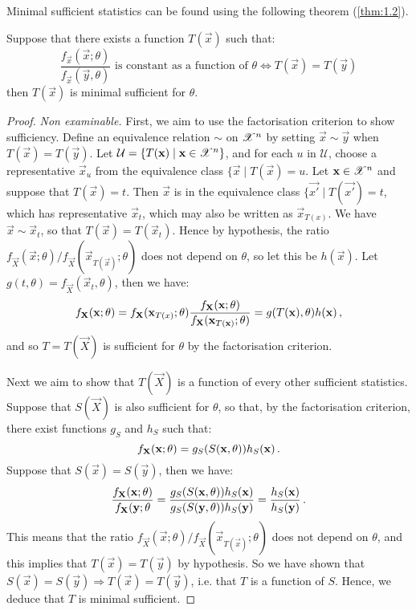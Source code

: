 Minimal sufficient statistics can be found using the following theorem (\ref{thm:1.2}).

\begin{theorem}
  \label{thm:1.2}

  Suppose that there exists a function $T(\vec{x})$ such that:
\[
\frac{f_{\vec{x}}(\vec{x}; \theta)}{f_{\vec{x}}(\vec{y}, \theta)} \text{ is constant as a function of $\theta$} \Leftrightarrow T(\vec{x}) = T(\vec{y})
\]
then $T(\vec{x})$ is minimal sufficient for $\theta$.
\end{theorem}

\begin{proof}
  \emph{Non examinable.} First, we aim to use the factorisation criterion to show sufficiency. Define an equivalence relation $\sim$ on $\mathscr{X}^n$ by setting $\vec{x} \sim \vec{y}$ when $T(\vec{x}) = T(\vec{y})$. 
Let $\mathcal{U} = \{ T(\mathbf{x}) \mid \mathbf{x} \in \mathscr{X}^n \}$, and for each $u$ in $\mathcal{U}$, choose a representative $\vec{x}_u$ from the equivalence class $\{ \vec{x} \mid T(\vec{x}) = u$. 
Let $\mathbf{x} \in \mathscr{X}^n$ and suppose that $T(\vec{x}) = t$. Then $\vec{x}$ is in the equivalence class $\{\vec{x'} \mid T(\vec{x'}) = t$, which has representative $\vec{x}_t$, which may also be written as $\vec{x}_{T(x)}$. 
We have $\vec{x} \sim \vec{x}_t$, so that $T(\vec{x}) = T(\vec{x}_t)$. Hence by hypothesis, the ratio $f_{\vec{X}}(\vec{x}; \theta) / f_{\vec{X}}(\vec{x}_{T(\vec{x})}; \theta)$ does not depend on $\theta$, so let this be $h(\vec{x})$.
Let $g(t, \theta) = f_{\vec{X}}(\vec{x}_t, \theta)$, then we have:
\[
f_{\mathbf{X}}(\mathbf{x}; \theta) = f_{\mathbf{X}}(\mathbf{x}_{T(x)}; \theta)\frac{f_{\mathbf{X}}(\mathbf{x}; \theta)}{f_{\mathbf{X}}(\mathbf{x}_{T(\mathbf{x})}; \theta)} = g(T(\mathbf{x}), \theta)h(\mathbf{x}) \, {,}
\]
and so $T = T(\vec{X})$ is sufficient for $\theta$ by the factorisation criterion.

Next we aim to show that $T(\vec{X})$ is a function of every other sufficient statistics. Suppose that $S(\vec{X})$ is also sufficient for $\theta$, so that, by the factorisation criterion, there exist functions $g_S$ and $h_S$ such that:
\[
f_{\mathbf{X}}(\mathbf{x}; \theta) = g_S(S(\mathbf{x}, \theta))h_S(\mathbf{x})\, {.}
\]
Suppose that $S(\vec{x}) = S(\vec{y})$, then we have:
\[
\frac{f_{\mathbf{X}}(\mathbf{x}; \theta)}{f_{\mathbf{X}}(\mathbf{y}; \theta} 
= \frac{g_S(S(\mathbf{x}, \theta))h_S(\mathbf{x})}{g_S(S(\mathbf{y}, \theta))h_S(\mathbf{y})}
= \frac{h_S(\mathbf{x})}{h_S(\mathbf{y})} \, {.}
\]
This means that the ratio $f_{\vec{X}}(\vec{x}; \theta) / f_{\vec{X}}(\vec{x}_{T(\vec{x})}; \theta)$ does not depend on $\theta$, and this implies that $T(\vec{x}) = T(\vec{y})$ by hypothesis. So we have shown that $S(\vec{x}) = S(\vec{y}) \Rightarrow T(\vec{x}) = T(\vec{y})$, i.e. that $T$ is a function of $S$. Hence, we deduce that $T$ is minimal sufficient.
\end{proof}

